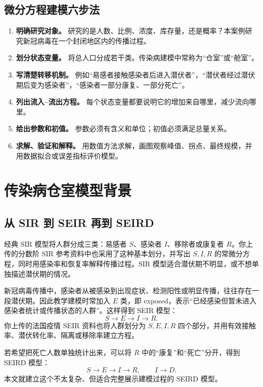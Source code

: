 \documentclass[UTF8,12pt,a4paper]{ctexart}
\begin{document}
\subsection{微分方程建模六步法}
\begin{enumerate}[label=\arabic*.]
\item \textbf{明确研究对象。} 研究的是人数、比例、浓度、库存量，还是概率？本案例研究新冠病毒在一个封闭地区内的传播过程。
\item \textbf{划分状态变量。} 将总人口分成若干类。传染病建模中常称为“仓室”或“舱室”。
\item \textbf{写清楚转移机制。} 例如“易感者接触感染者后进入潜伏者”，“潜伏者经过潜伏期后变为感染者”，“感染者一部分康复、一部分死亡”。
\item \textbf{列出流入--流出方程。} 每个状态变量都要说明它的增加来自哪里，减少流向哪里。
\item \textbf{给出参数和初值。} 参数必须有含义和单位；初值必须满足总量关系。
\item \textbf{求解、验证和解释。} 用数值方法求解，画图观察峰值、拐点、最终规模，并用数据拟合或误差指标评价模型。
\end{enumerate}

\section{传染病仓室模型背景}
\subsection{从 SIR 到 SEIR 再到 SEIRD}
经典 SIR 模型将人群分成三类：易感者 $S$、感染者 $I$、移除者或康复者 $R$。你上传的分数阶 SIR 参考资料中也采用了这种基本划分，并写出 $S,I,R$ 的常微分方程，同时用感染率和恢复率解释传播过程。SIR 模型适合潜伏期不明显，或不想单独描述潜伏期的情况。

新冠病毒传播中，感染者从被感染到出现症状、检测阳性或明显传播，往往存在一段潜伏期。因此教学建模时常加入 $E$ 类，即 exposed，表示“已经感染但暂未进入感染者统计或传播状态的人群”。这样得到 SEIR 模型：
\[
S\rightarrow E\rightarrow I\rightarrow R.
\]
你上传的法国疫情 SEIR 资料也将人群划分为 $S,E,I,R$ 四个部分，并用有效接触率、潜伏转化率、隔离或移除率建立方程。

若希望把死亡人数单独统计出来，可以将 $R$ 中的“康复”和“死亡”分开，得到 SEIRD 模型：
\[
S\rightarrow E\rightarrow I\rightarrow R,\qquad I\rightarrow D.
\]
本文就建立这个不太复杂、但适合完整展示建模过程的 SEIRD 模型。
\end{document}
